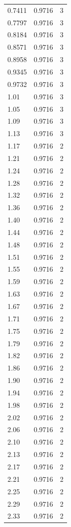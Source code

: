 \begin{longtable}{lrr}
  0.7411 & 0.9716 & 3 \\
  0.7797 & 0.9716 & 3 \\
  0.8184 & 0.9716 & 3 \\
  0.8571 & 0.9716 & 3 \\
  0.8958 & 0.9716 & 3 \\
  0.9345 & 0.9716 & 3 \\
  0.9732 & 0.9716 & 3 \\
  1.01 & 0.9716 & 3 \\
  1.05 & 0.9716 & 3 \\
  1.09 & 0.9716 & 3 \\
  1.13 & 0.9716 & 3 \\
  1.17 & 0.9716 & 2 \\
  1.21 & 0.9716 & 2 \\
  1.24 & 0.9716 & 2 \\
  1.28 & 0.9716 & 2 \\
  1.32 & 0.9716 & 2 \\
  1.36 & 0.9716 & 2 \\
  1.40 & 0.9716 & 2 \\
  1.44 & 0.9716 & 2 \\
  1.48 & 0.9716 & 2 \\
  1.51 & 0.9716 & 2 \\
  1.55 & 0.9716 & 2 \\
  1.59 & 0.9716 & 2 \\
  1.63 & 0.9716 & 2 \\
  1.67 & 0.9716 & 2 \\
  1.71 & 0.9716 & 2 \\
  1.75 & 0.9716 & 2 \\
  1.79 & 0.9716 & 2 \\
  1.82 & 0.9716 & 2 \\
  1.86 & 0.9716 & 2 \\
  1.90 & 0.9716 & 2 \\
  1.94 & 0.9716 & 2 \\
  1.98 & 0.9716 & 2 \\
  2.02 & 0.9716 & 2 \\
  2.06 & 0.9716 & 2 \\
  2.10 & 0.9716 & 2 \\
  2.13 & 0.9716 & 2 \\
  2.17 & 0.9716 & 2 \\
  2.21 & 0.9716 & 2 \\
  2.25 & 0.9716 & 2 \\
  2.29 & 0.9716 & 2 \\
  2.33 & 0.9716 & 2 \\

\end{longtable}
